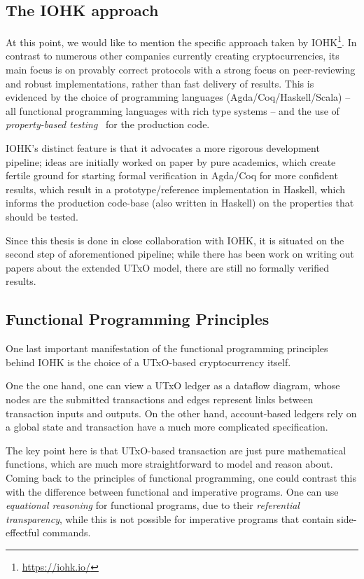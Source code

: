\documentclass[acmsmall,nonacm=true,screen=true]{acmart}
\newcommand\site[1]{\footnote{\url{#1}}}
\begin{document}
\subsection{The IOHK approach}
At this point, we would like to mention the specific approach taken by IOHK\site{https://iohk.io/}.
In contrast to numerous other companies currently creating cryptocurrencies, its main focus
is on provably correct protocols with a strong focus on peer-reviewing and robust implementations, rather
than fast delivery of results.
This is evidenced by the choice of programming languages (Agda/Coq/Haskell/Scala)
-- all functional programming languages with rich type systems --
and the use of \textit{property-based testing}~\cite{quickcheck} for the production code.

IOHK's distinct feature is that it advocates a more rigorous development pipeline;
ideas are initially worked on paper by pure academics,
which create fertile ground for starting formal verification in Agda/Coq for more confident results, 
which result in a prototype/reference implementation in Haskell,
which informs the production code-base (also written in Haskell) on the properties that should be tested.

Since this thesis is done in close collaboration with IOHK, it is situated on the second step of aforementioned pipeline;
while there has been work on writing out papers about the extended UTxO model, there are still no formally verified results.

\subsection{Functional Programming Principles}
One last important manifestation of the functional programming principles behind IOHK is the choice
of a UTxO-based cryptocurrency itself.

One the one hand, one can view a UTxO ledger as a dataflow diagram, whose nodes are the submitted transactions
and edges represent links between transaction inputs and outputs.
On the other hand, account-based ledgers rely on a global state and transaction have a much more complicated
specification.

The key point here is that UTxO-based transaction are just pure mathematical functions, which are much more
straightforward to model and reason about.
Coming back to the principles of functional programming, one could contrast this with the difference between
functional and imperative programs.
One can use \textit{equational reasoning} for functional programs, due to their \textit{referential transparency},
while this is not possible for imperative programs that contain side-effectful commands.
\end{document}
